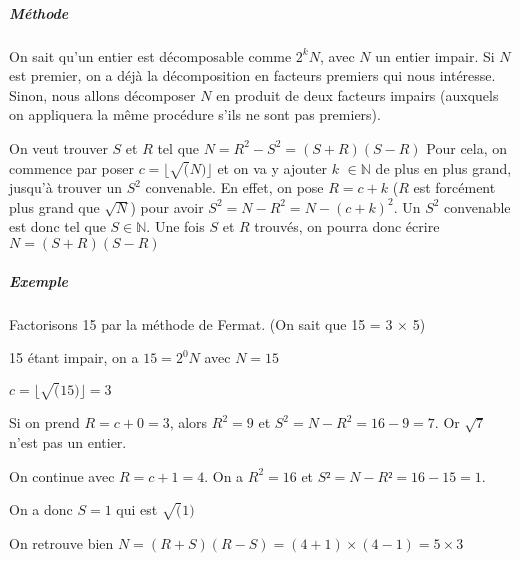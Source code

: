 \documentclass[11pt,a4paper]{article}
\begin{document}
	
		\subparagraph{Méthode}
	On sait qu'un entier est décomposable comme $2^{k}N$, avec $\mathit{N}$ un entier impair. Si $\mathit{N}$ est premier, on a déjà la décomposition en facteurs premiers qui nous intéresse. Sinon, nous allons décomposer $\mathit{N}$ en produit de deux facteurs impairs (auxquels on appliquera la même procédure s'ils ne sont pas premiers). 
	
	On veut trouver $\mathit{S}$ et $\mathit{R}$ tel que $\mathit{N = R^2 - S^2 = (S+R)(S-R)}$
	Pour cela, on commence par poser $\mathit{c = \lfloor \sqrt(N)\rfloor}$ et on va y ajouter $\mathit{k}$ $\in\mathbb{N}$ de plus en plus grand, jusqu'à trouver un $\mathit{S^2}$ convenable. En effet, on pose $\mathit{R = c + k}$ ($\mathit{R}$ est forcément plus grand que $\mathit{\sqrt{N}}$) pour avoir
	 $\mathit{S^{2} = N - R^{2} = N - (c+k)^{2}}$.
	 Un $\mathit{S^2}$ convenable est donc tel que $\mathit{S} \in \mathbb{N}$. Une fois $\mathit{S}$ et $\mathit{R}$ trouvés, on pourra donc écrire $\mathit{N = (S+R)(S-R)}$
		\subparagraph{Exemple}
	Factorisons 15 par la méthode de Fermat. (On sait que 15 = 3 $\times$  5)
	
	15 étant impair, on a $\mathit{15 = 2^{0}N}$ avec $\mathit{N = 15}$
	
	$\mathit{c = \lfloor \sqrt(15)\rfloor = 3}$
	
	Si on prend $\mathit{R = c + 0 = 3}$, alors $\mathit{R^2 = 9}$ et $\mathit{S^2 = N - R^2 = 16 - 9 = 7}$. Or $\sqrt{7}$ n'est pas un entier. 
	
	On continue avec $\mathit{R = c + 1 = 4}$. On a $\mathit{R^2 = 16}$ et $\mathit{S² = N - R² = 16 - 15 = 1}$.
	
	On a donc $\mathit{S = 1}$ qui est $\sqrt(1)$
	
	On retrouve bien $\mathit{N = (R+S)(R-S) = (4+1) \times  (4-1) = 5 \times 3}$
	\newpage
	
	
\end{document}
